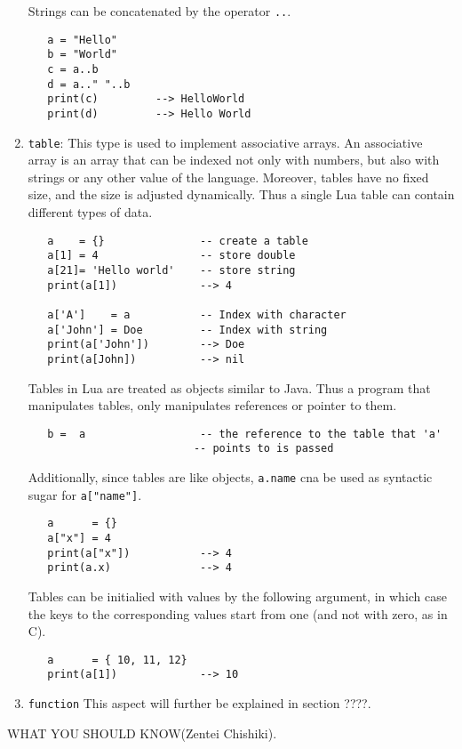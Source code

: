 \begin{enumerate}
Strings can be concatenated by the operator {\tt ..}.
\begin{verbatim}
   a = "Hello"
   b = "World"
   c = a..b
   d = a.." "..b
   print(c)         --> HelloWorld
   print(d)         --> Hello World
\end{verbatim}

\item {\tt table}: This type is used to implement associative arrays.
An associative array is an array that can be indexed not only with
numbers, but also with strings or any other value of the language. 
Moreover, tables have no fixed size, and the size is adjusted dynamically.
Thus a single Lua table can contain different types of data.
\begin{verbatim}
   a    = {}               -- create a table
   a[1] = 4                -- store double
   a[21]= 'Hello world'    -- store string
   print(a[1])             --> 4

   a['A']    = a           -- Index with character
   a['John'] = Doe         -- Index with string
   print(a['John'])        --> Doe
   print(a[John])          --> nil
\end{verbatim}
Tables in Lua are treated as objects similar to Java. Thus a
program that manipulates tables, only manipulates references
or pointer to them. 
\begin{verbatim}
   b =  a                  -- the reference to the table that 'a'
                          -- points to is passed
\end{verbatim}

Additionally, since tables are like objects,
{\tt a.name} cna be used as syntactic sugar for {\tt a["name"]}.
\begin{verbatim}
   a      = {}
   a["x"] = 4 
   print(a["x"])           --> 4
   print(a.x)              --> 4
\end{verbatim}
Tables can be initialied with values by the following argument,
in which case the keys to the corresponding values start from
one (and not with zero, as in C).
\begin{verbatim}
   a      = { 10, 11, 12}
   print(a[1])             --> 10
\end{verbatim}

\item {\tt function} This aspect will further be explained in
section ????.

\end{enumerate}

WHAT YOU SHOULD KNOW(Zentei Chishiki).

